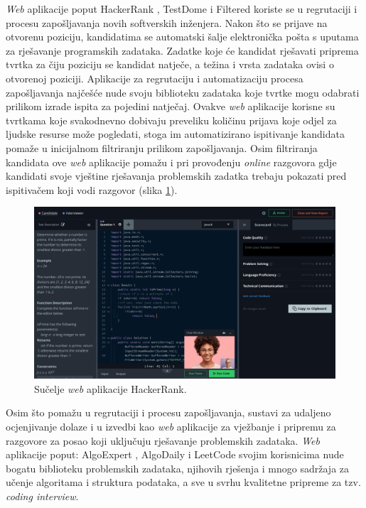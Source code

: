 \documentclass[times, utf8, diplomski]{fer}
\begin{document}
\textit{Web} aplikacije poput HackerRank \citep{HackerRank}, TestDome \citep{TestDome} i Filtered \citep{Filtered} koriste se u regrutaciji i procesu zapošljavanja novih softverskih inženjera. Nakon što se prijave na otvorenu poziciju, kandidatima se automatski šalje elektronička pošta s uputama za rješavanje programskih zadataka. Zadatke koje će kandidat rješavati priprema tvrtka za čiju poziciju se kandidat natječe, a težina i vrsta zadataka ovisi o otvorenoj poziciji. Aplikacije za regrutaciju i automatizaciju procesa zapošljavanja najčešće nude svoju biblioteku zadataka koje tvrtke mogu odabrati prilikom izrade ispita za pojedini natječaj. Ovakve \textit{web} aplikacije korisne su tvrtkama koje svakodnevno dobivaju preveliku količinu prijava koje odjel za ljudske resurse može pogledati, stoga im automatizirano ispitivanje kandidata pomaže u inicijalnom filtriranju  prilikom zapošljavanja. Osim filtriranja kandidata ove \textit{web} aplikacije pomažu i pri provođenju \textit{online} razgovora gdje kandidati svoje vještine rješavanja problemskih zadatka trebaju pokazati pred ispitivačem koji vodi razgovor (slika \ref{fig:hackerrank-ui}).

\begin{figure}[htb]
	\centering
	\includegraphics[width=\textwidth]{images/HackerRank UI.png}
	\caption{
		Sučelje \textit{web} aplikacije HackerRank. \citep{HackerRank}
	}
	\label{fig:hackerrank-ui}
\end{figure}

Osim što pomažu u regrutaciji i procesu zapošljavanja, sustavi za udaljeno ocjenjivanje dolaze i u izvedbi kao \textit{web} aplikacije za vježbanje i pripremu za razgovore za posao koji uključuju rješavanje problemskih zadataka. \textit{Web} aplikacije poput: AlgoExpert \citep{AlgoExpert}, AlgoDaily \citep{AlgoDaily} i LeetCode \citep{LeetCode} svojim korisnicima nude bogatu biblioteku problemskih zadataka, njihovih rješenja i mnogo sadržaja za učenje algoritama i struktura podataka, a sve u svrhu kvalitetne pripreme za tzv. \textit{coding interview}.
\end{document}
